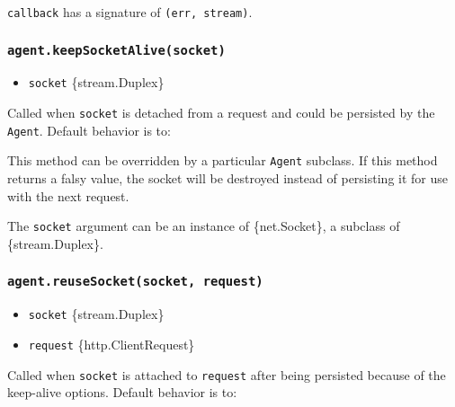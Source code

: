 \texttt{callback} has a signature of \texttt{(err,\ stream)}.

\subsubsection{\texorpdfstring{\texttt{agent.keepSocketAlive(socket)}}{agent.keepSocketAlive(socket)}}\label{agent.keepsocketalivesocket}

\begin{itemize}
\tightlist
\item
  \texttt{socket} \{stream.Duplex\}
\end{itemize}

Called when \texttt{socket} is detached from a request and could be
persisted by the \texttt{Agent}. Default behavior is to:

\begin{Shaded}
\begin{Highlighting}[]
\NormalTok{(}\OperatorTok{,} \NormalTok{)}\OperatorTok{;}
\NormalTok{()}\OperatorTok{;}
 \OperatorTok{;}
\end{Highlighting}
\end{Shaded}

This method can be overridden by a particular \texttt{Agent} subclass.
If this method returns a falsy value, the socket will be destroyed
instead of persisting it for use with the next request.

The \texttt{socket} argument can be an instance of \{net.Socket\}, a
subclass of \{stream.Duplex\}.

\subsubsection{\texorpdfstring{\texttt{agent.reuseSocket(socket,\ request)}}{agent.reuseSocket(socket, request)}}\label{agent.reusesocketsocket-request}

\begin{itemize}
\tightlist
\item
  \texttt{socket} \{stream.Duplex\}
\item
  \texttt{request} \{http.ClientRequest\}
\end{itemize}

Called when \texttt{socket} is attached to \texttt{request} after being
persisted because of the keep-alive options. Default behavior is to:

